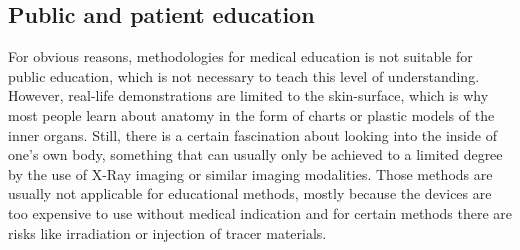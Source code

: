 \subsection{Public and patient education}
For obvious reasons, methodologies for medical education is not suitable for public education, which is not necessary to teach this level of understanding. 
However, real-life demonstrations are limited to the skin-surface, which is why most people learn about anatomy in the form of charts or plastic models of the inner organs. Still, there is a certain fascination about looking into the inside of one's own body, something that can usually only be achieved to a limited degree by the use of X-Ray imaging or similar imaging modalities. Those methods are usually not applicable for educational methods, mostly because the devices are too expensive to use without medical indication and for certain methods there are risks like irradiation or injection of tracer materials.

